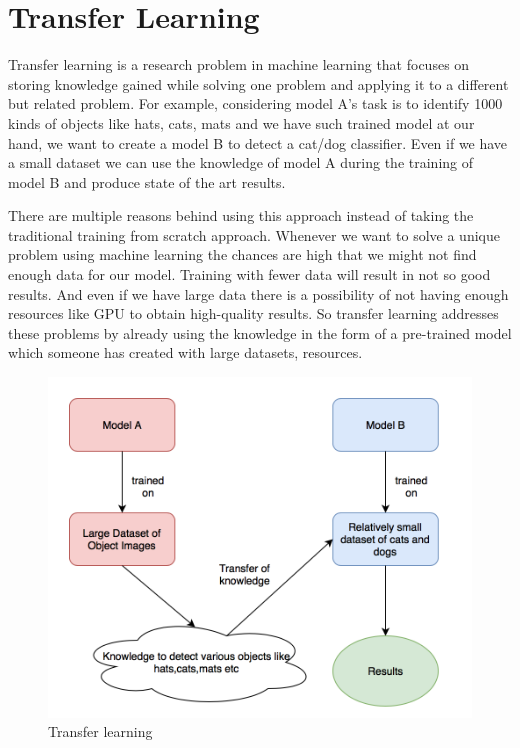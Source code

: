 \documentclass[12pt]{report}
\begin{document}
\section{Transfer Learning}
Transfer learning is a research problem in machine learning that focuses on storing knowledge gained while solving one problem and applying it to a different but related problem. For example, considering model A's task is to identify 1000 kinds of objects like hats, cats, mats and we have such trained model at our hand, we want to create a model B to detect a cat/dog classifier. Even if we have a small dataset we can use the knowledge of model A during the training of model B and produce state of the art results. \cite{Transfer}

\noindent There are multiple reasons behind using this approach instead of taking the traditional training from scratch approach. Whenever we want to solve a unique problem using machine learning the chances are high that we might not find enough data for our model. Training with fewer data will result in not so good results. And even if we have large data there is a possibility of not having enough resources like GPU to obtain high-quality results. So transfer learning addresses these problems by already using the knowledge in the form of a pre-trained model which someone has created with large datasets, resources.

\begin{figure}[h]
\centering
\includegraphics[width=1\textwidth]{Pic1}
\caption{Transfer learning}
\label{fig:test4}
\end{figure}
\end{document}

